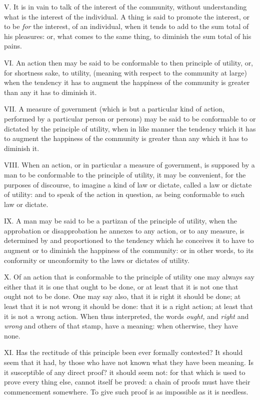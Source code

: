 \documentclass[12pt]{report}
\begin{document}
V. It is in vain to talk of the interest of the community, without
understanding what is the interest of the individual. A thing is said to
promote the interest, or to be \emph{for} the interest, of an
individual, when it tends to add to the sum total of his pleasures: or,
what comes to the same thing, to diminish the sum total of his pains.

VI. An action then may be said to be conformable to then principle of
utility, or, for shortness sake, to utility, (meaning with respect to
the community at large) when the tendency it has to augment the
happiness of the community is greater than any it has to diminish it.

VII. A measure of government (which is but a particular kind of action,
performed by a particular person or persons) may be said to be
conformable to or dictated by the principle of utility, when in like
manner the tendency which it has to augment the happiness of the
community is greater than any which it has to diminish it.

VIII. When an action, or in particular a measure of government, is
supposed by a man to be conformable to the principle of utility, it may
be convenient, for the purposes of discourse, to imagine a kind of law
or dictate, called a law or dictate of utility: and to speak of the
action in question, as being conformable to such law or dictate.

IX. A man may be said to be a partizan of the principle of utility, when
the approbation or disapprobation he annexes to any action, or to any
measure, is determined by and proportioned to the tendency which he
conceives it to have to augment or to diminish the happiness of the
community: or in other words, to its conformity or unconformity to the
laws or dictates of utility.

X. Of an action that is conformable to the principle of utility one may
always say either that it is one that ought to be done, or at least that
it is not one that ought not to be done. One may say also, that it is
right it should be done; at least that it is not wrong it should be
done: that it is a right action; at least that it is not a wrong action.
When thus interpreted, the words \emph{ought,} and \emph{right} and
\emph{wrong} and others of that stamp, have a meaning: when otherwise,
they have none.

XI. Has the rectitude of this principle been ever formally contested? It
should seem that it had, by those who have not known what they have been
meaning. Is it susceptible of any direct proof? it should seem not: for
that which is used to prove every thing else, cannot itself be proved: a
chain of proofs must have their commencement somewhere. To give such
proof is as impossible as it is needless.
\end{document}
